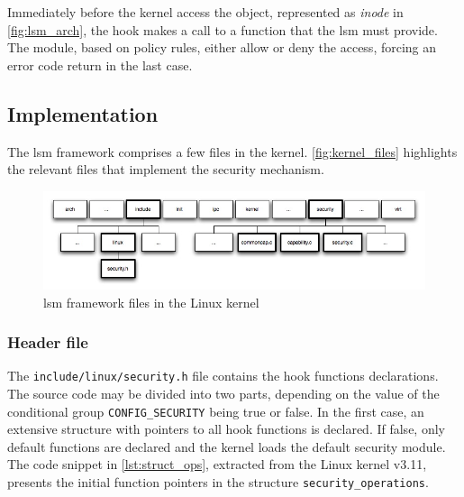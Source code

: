 Immediately before the kernel access the object, represented as \textit{inode} in \autoref{fig:lsm_arch}, the hook makes a call to a function that the \gls{lsm} must provide. The module, based on policy rules, either allow or deny the access, forcing an error code return in the last case.

\subsection{Implementation}

The \gls{lsm} framework comprises a few files in the kernel. \autoref{fig:kernel_files} highlights the relevant files that implement the security mechanism.

\begin{figure}[h]
 \centering
 \includegraphics[scale=0.5]{figures/kernel_files.jpg}
 \caption{\gls{lsm} framework files in the Linux kernel}
 \label{fig:kernel_files}
\end{figure}

\subsubsection{Header file}
\label{sec:header_file}

The \texttt{include/linux/security.h} file contains the hook functions declarations. The source code may be divided into two parts, depending on the value of the conditional group \texttt{CONFIG\_SECURITY} being true or false. In the first case, an extensive structure with pointers to all hook functions is declared. If false, only default functions are declared and the kernel loads the default security module. The code snippet in \autoref{lst:struct_ops}, extracted from the Linux kernel v3.11, presents the initial function pointers in the structure \texttt{security\_operations}.

